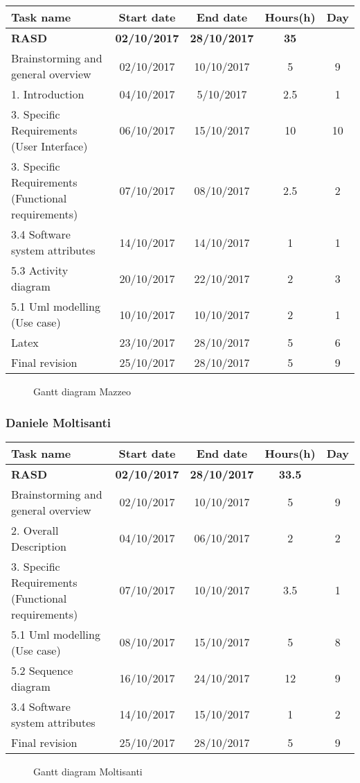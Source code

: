 \begin{table}[h!]
	\begin{tabular}{lcccc}
		\toprule
		\textbf{Task name} & \textbf{Start date} & \textbf{End date} & \textbf{Hours(h)} & \textbf{Day} \\
		\midrule
		\textbf{RASD} & \textbf{02/10/2017} & \textbf{28/10/2017} & \textbf{35} &  \\
		Brainstorming and general overview & 02/10/2017 & 10/10/2017 & 5 & 9 \\
		1. Introduction & 04/10/2017 & 5/10/2017 & 2.5 & 1 \\
		3. Specific Requirements (User Interface) & 06/10/2017 & 15/10/2017 & 10 & 10 \\
		3. Specific Requirements (Functional requirements) & 07/10/2017 & 08/10/2017 & 2.5 & 2 \\
		3.4 Software system attributes & 14/10/2017 & 14/10/2017 & 1 & 1 \\
		5.3 Activity diagram & 20/10/2017 & 22/10/2017 & 2 & 3 \\
		5.1 Uml modelling (Use case) & 10/10/2017 & 10/10/2017 & 2 & 1 \\
		Latex & 23/10/2017 & 28/10/2017 & 5 & 6 \\
		\bottomrule
		Final revision & 25/10/2017 & 28/10/2017 & 5 & 9 \\
	\end{tabular}
\end{table}

\begin{figure}[!h]
	\centering
	\caption{Gantt diagram Mazzeo}
\end{figure}
\clearpage

\subsubsection{Daniele Moltisanti}
\begin{table}[h!]
	\begin{tabular}{lcccc}
		\toprule
		\textbf{Task name} & \textbf{Start date} & \textbf{End date} & \textbf{Hours(h)} & \textbf{Day} \\
		\midrule
		\textbf{RASD} & \textbf{02/10/2017} & \textbf{28/10/2017} & \textbf{33.5} & \\
		Brainstorming and general overview & 02/10/2017 & 10/10/2017 & 5 & 9 \\
		2. Overall Description & 04/10/2017 & 06/10/2017 & 2 & 2 \\
		3. Specific Requirements (Functional requirements) & 07/10/2017 & 10/10/2017 & 3.5 & 1 \\
		5.1 Uml modelling (Use case) & 08/10/2017 & 15/10/2017 & 5 & 8 \\
		5.2 Sequence diagram & 16/10/2017 & 24/10/2017 & 12 & 9 \\
		3.4 Software system attributes & 14/10/2017 & 15/10/2017 & 1 & 2 \\
		\bottomrule
		Final revision & 25/10/2017 & 28/10/2017 & 5 & 9 \\
	\end{tabular}
\end{table}

\begin{figure}[!h]
	\centering
	\caption{Gantt diagram Moltisanti}
\end{figure}
\clearpage